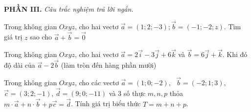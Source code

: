 \textbf{PHẦN III.} \textit{Câu trắc nghiệm trả lời ngắn.}\\
\begin{ex}
	Trong không gian $Oxyz$, cho hai vectơ $\vec{a}=(1;2;-3);\vec{b}=(-1;-2;z)$. Tìm giá trị $z$ sao cho	$\vec{a}+\vec{b}=\vec{0}$
\end{ex}
\begin{ex}
	Trong không gian $Oxyz$, cho hai vectơ $\vec{a}=2\vec{i}-3\vec{j}+6\vec{k}$ và $\vec{b}=6\vec{j}+\vec{k}$. Khi đó độ dài của
	$\vec{a}-2\vec{b}$ (làm tròn đến hàng phần mười)
\end{ex}
\begin{ex}
	Trong không gian $Oxyz$, cho các vectơ $\vec{a}=(1;0;-2),\text{ }\vec{b}=(-2;1;3)$,$\vec{c}=(3;2;-1)$, $\vec{d}=(9;0;-11)$ và $3$ số thực $m,n,p$ thỏa $m \cdot \vec{a}+n \cdot \vec{b}+p\vec{c}=\vec{d}$. Tính giá trị biểu thức $T=m+n+p$.
\end{ex}
